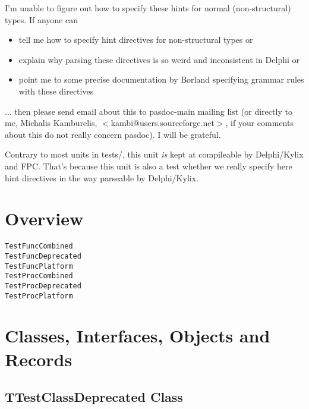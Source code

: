 \documentclass{report}
\begin{document}
I'm unable to figure out how to specify these hints for normal (non{-}structural) types. If anyone can \begin{itemize}
\item tell me how to specify hint directives for non{-}structural types or
\item explain why parsing these directives is so weird and inconsistent in Delphi or
\item point me to some precise documentation by Borland specifying grammar rules with these directives
\end{itemize} ... then please send email about this to pasdoc{-}main mailing list (or directly to me, Michalis Kamburelis, {$<$}kambi@users.sourceforge.net{$>$}, if your comments about this do not really concern pasdoc). I will be grateful.

Contrary to most units in tests/, this unit \textit{is} kept at compileable by Delphi/Kylix and FPC. That's because this unit is also a test whether we really specify here hint directives in the way parseable by Delphi/Kylix.
\section{Overview}
\begin{description}
\item[\texttt{\begin{ttfamily}TTestClassDeprecated\end{ttfamily} Class}]
\item[\texttt{\begin{ttfamily}TTestRecordDeprecated\end{ttfamily} Record}]
\end{description}
\begin{description}
\item[\texttt{TestFuncCombined}]
\item[\texttt{TestFuncDeprecated}]
\item[\texttt{TestFuncPlatform}]
\item[\texttt{TestProcCombined}]
\item[\texttt{TestProcDeprecated}]
\item[\texttt{TestProcPlatform}]
\end{description}
\section{Classes, Interfaces, Objects and Records}
\subsection*{TTestClassDeprecated Class}
\end{document}
